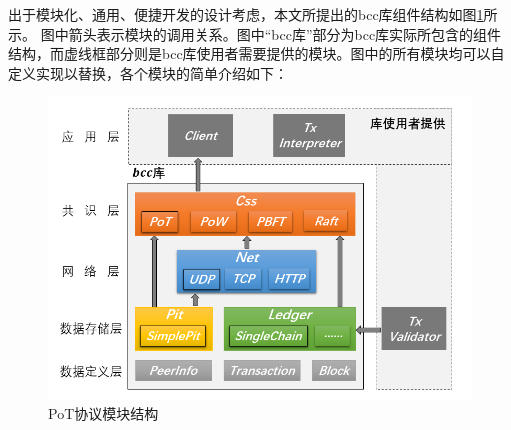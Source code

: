出于模块化、通用、便捷开发的设计考虑，本文所提出的bcc库组件结构如图\ref{fig:modules}所示。
图中箭头表示模块的调用关系。图中“bcc库”部分为bcc库实际所包含的组件结构，而虚线框部分则是bcc库使用者需要提供的模块。图中的所有模块均可以自定义实现以替换，各个模块的简单介绍如下：



\begin{figure}[H]
	\centerline{\includegraphics[width=0.7\columnwidth]{figure/chap5-bcc/fig-pot-bcc.png}}
	\caption{PoT协议模块结构}
	\label{fig:modules}
\end{figure}

